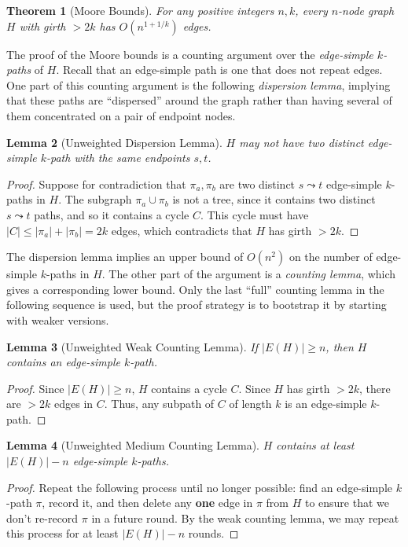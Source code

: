 \documentclass{article}\usepackage[a4paper,margin=20mm]{geometry}
\newtheorem{theorem}{Theorem}\newtheorem{lemma}[theorem]{Lemma}\newtheorem{proposition}[theorem]{Proposition}\newtheorem{corollary}[theorem]{Corollary}\newtheorem{definition}[theorem]{Definition}\newtheorem{claim}[theorem]{Claim}\newtheorem{remark}[theorem]{Remark}\newtheorem{observation}[theorem]{Observation}\newtheorem{conjecture}[theorem]{Conjecture}\newtheorem{example}[theorem]{Example}
\begin{document}
\begin{theorem} [Moore Bounds]
For any positive integers $n, k$, every $n$-node graph $H$ with girth $>2k$ has $O(n^{1+1/k})$ edges.
\end{theorem}

The proof of the Moore bounds is a counting argument over the \emph{edge-simple $k$-paths} of $H$.
Recall that an edge-simple path is one that does not repeat edges.
One part of this counting argument is the following \emph{dispersion lemma}, implying that these paths are ``dispersed'' around the graph rather than having several of them concentrated on a pair of endpoint nodes.

\begin{lemma} [Unweighted Dispersion Lemma]
$H$ may not have two distinct edge-simple $k$-path with the same endpoints $s, t$.
\end{lemma}
\begin{proof}
Suppose for contradiction that $\pi_a, \pi_b$ are two distinct $s \leadsto t$ edge-simple $k$-paths in $H$.
The subgraph $\pi_a \cup \pi_b$ is not a tree, since it contains two distinct $s \leadsto t$ paths, and so it contains a cycle $C$.
This cycle must have $|C| \le |\pi_a| + |\pi_b| = 2k$ edges, which contradicts that $H$ has girth $>2k$.
\end{proof}

The dispersion lemma implies an upper bound of $O(n^2)$ on the number of edge-simple $k$-paths in $H$.
The other part of the argument is a \emph{counting lemma}, which gives a corresponding lower bound.
Only the last ``full'' counting lemma in the following sequence is used, but the proof strategy is to bootstrap it by starting with weaker versions.

\begin{lemma} [Unweighted Weak Counting Lemma]
If $|E(H)| \ge n$, then $H$ contains an edge-simple $k$-path.
\end{lemma}
\begin{proof}
Since $|E(H)| \ge n$, $H$ contains a cycle $C$.
Since $H$ has girth $>2k$, there are $>2k$ edges in $C$.
Thus, any subpath of $C$ of length $k$ is an edge-simple $k$-path.
\end{proof}


\begin{lemma} [Unweighted Medium Counting Lemma]
$H$ contains at least $|E(H)| - n$ edge-simple $k$-paths.
\end{lemma}
\begin{proof}
Repeat the following process until no longer possible: find an edge-simple $k$-path $\pi$, record it, and then delete any \textbf{one} edge in $\pi$ from $H$ to ensure that we don't re-record $\pi$ in a future round.
By the weak counting lemma, we may repeat this process for at least $|E(H)| - n$ rounds.
\end{proof}
\end{document}
